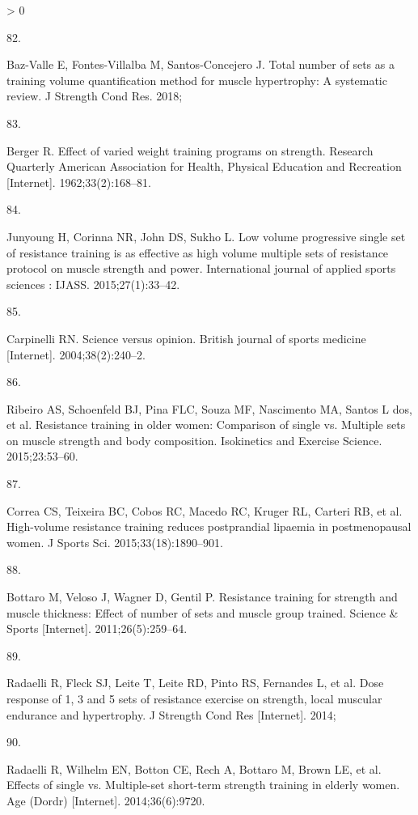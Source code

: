 \documentclass[twoside,10pt]{gihclass} %
\newlength{\cslhangindent}
\newlength{\csllabelwidth}
\newenvironment{CSLReferences}[3] %
 {%
  \setlength{\parindent}{0pt}
  \ifodd #1 \everypar{\setlength{\hangindent}{\cslhangindent}}\ignorespaces\fi
  \ifnum #2 > 0
  \setlength{\parskip}{#2\baselineskip}
  \fi
 }%
 {}
\newcommand{\CSLLeftMargin}[1]{\parbox[t]{\maxof{\widthof{#1}}{\csllabelwidth}}{#1}}
\newcommand{\CSLRightInline}[1]{\parbox[t]{\linewidth}{#1}}
\begin{document}
\begin{CSLReferences}{0}{0}
\leavevmode\hypertarget{ref-RN2130}{}%
\CSLLeftMargin{82. }
\CSLRightInline{Baz-Valle E, Fontes-Villalba M, Santos-Concejero J. Total number of sets as a training volume quantification method for muscle hypertrophy: A systematic review. J Strength Cond Res. 2018; }

\leavevmode\hypertarget{ref-RN1476}{}%
\CSLLeftMargin{83. }
\CSLRightInline{Berger R. Effect of varied weight training programs on strength. Research Quarterly American Association for Health, Physical Education and Recreation {[}Internet{]}. 1962;33(2):168--81. }

\leavevmode\hypertarget{ref-RN2568}{}%
\CSLLeftMargin{84. }
\CSLRightInline{Junyoung H, Corinna NR, John DS, Sukho L. Low volume progressive single set of resistance training is as effective as high volume multiple sets of resistance protocol on muscle strength and power. International journal of applied sports sciences : IJASS. 2015;27(1):33--42. }

\leavevmode\hypertarget{ref-RN2201}{}%
\CSLLeftMargin{85. }
\CSLRightInline{Carpinelli RN. Science versus opinion. British journal of sports medicine {[}Internet{]}. 2004;38(2):240--2. }

\leavevmode\hypertarget{ref-RN2465}{}%
\CSLLeftMargin{86. }
\CSLRightInline{Ribeiro AS, Schoenfeld BJ, Pina FLC, Souza MF, Nascimento MA, Santos L dos, et al. Resistance training in older women: Comparison of single vs. Multiple sets on muscle strength and body composition. Isokinetics and Exercise Science. 2015;23:53--60. }

\leavevmode\hypertarget{ref-RN2464}{}%
\CSLLeftMargin{87. }
\CSLRightInline{Correa CS, Teixeira BC, Cobos RC, Macedo RC, Kruger RL, Carteri RB, et al. High-volume resistance training reduces postprandial lipaemia in postmenopausal women. J Sports Sci. 2015;33(18):1890--901. }

\leavevmode\hypertarget{ref-RN2463}{}%
\CSLLeftMargin{88. }
\CSLRightInline{Bottaro M, Veloso J, Wagner D, Gentil P. Resistance training for strength and muscle thickness: Effect of number of sets and muscle group trained. Science \& Sports {[}Internet{]}. 2011;26(5):259--64. }

\leavevmode\hypertarget{ref-RN1570}{}%
\CSLLeftMargin{89. }
\CSLRightInline{Radaelli R, Fleck SJ, Leite T, Leite RD, Pinto RS, Fernandes L, et al. Dose response of 1, 3 and 5 sets of resistance exercise on strength, local muscular endurance and hypertrophy. J Strength Cond Res {[}Internet{]}. 2014; }

\leavevmode\hypertarget{ref-RN1518}{}%
\CSLLeftMargin{90. }
\CSLRightInline{Radaelli R, Wilhelm EN, Botton CE, Rech A, Bottaro M, Brown LE, et al. Effects of single vs. Multiple-set short-term strength training in elderly women. Age (Dordr) {[}Internet{]}. 2014;36(6):9720. }


\end{CSLReferences}
\end{document}
